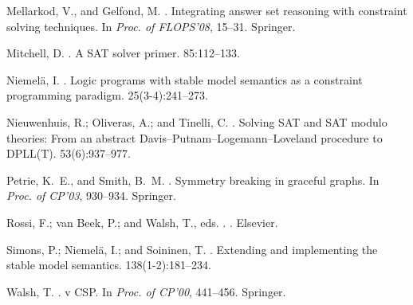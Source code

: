 \documentclass[letterpaper]{article}
\begin{document}
\begin{thebibliography}{}
Mellarkod, V., and Gelfond, M.
.
\newblock Integrating answer set reasoning with constraint solving techniques.
\newblock In {\em Proc. of FLOPS'08},  15--31.
\newblock Springer.

Mitchell, D.
.
\newblock A {SAT} solver primer.
 85:112--133.

Niemel{\"a}, I.
.
\newblock Logic programs with stable model semantics as a constraint
  programming paradigm.
  25(3-4):241--273.

Nieuwenhuis, R.; Oliveras, A.; and Tinelli, C.
.
\newblock Solving {SAT} and {SAT} modulo theories: From an abstract
  {D}avis--{P}utnam--{L}ogemann--{L}oveland procedure to {DPLL(T)}.
 53(6):937--977.

Petrie, K.~E., and Smith, B.~M.
.
\newblock Symmetry breaking in graceful graphs.
\newblock In {\em Proc. of CP'03},  930--934.
\newblock Springer.

Rossi, F.; {van Beek}, P.; and Walsh, T., eds.
.
.
\newblock Elsevier.

Simons, P.; Niemel{\"a}, I.; and Soininen, T.
.
\newblock Extending and implementing the stable model semantics.
 138(1-2):181--234.

Walsh, T.
.
 v {CSP}.
\newblock In {\em Proc. of CP'00},  441--456.
\newblock Springer.

\end{thebibliography}
\end{document}
